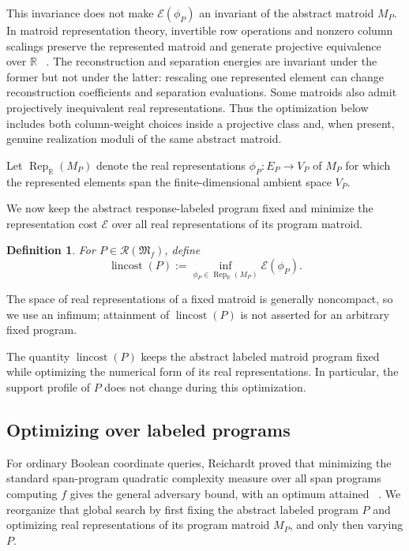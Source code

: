 \documentclass[11pt]{article}
\numberwithin{equation}{section}
\newtheorem{definition}{Definition}[section]
\theoremstyle{remark}
\begin{document}
This invariance does not make $\mathcal E(\phi_P)$ an invariant of the
abstract matroid $M_P$. In matroid representation theory, invertible row
operations and nonzero column scalings preserve the represented matroid and
generate projective equivalence over $\mathbb R$
~\cite[Sec.~6.3]{Oxley2011}. The reconstruction and separation energies are invariant under the former
but not under the latter: rescaling one represented element can change
reconstruction coefficients and separation evaluations. Some matroids also
admit projectively inequivalent real representations. Thus the optimization
below includes both column-weight choices inside a projective class and,
when present, genuine realization moduli of the same abstract matroid.

Let $\operatorname{Rep}_{\mathbb R}(M_P)$ denote the real representations
$\phi_P:E_P\to V_P$ of $M_P$ for which the represented elements span the
finite-dimensional ambient space $V_P$.

We now keep the abstract response-labeled program fixed and minimize the
representation cost $\mathcal E$ over all real representations of its program
matroid.

\begin{definition}
\label{def:linear-cost}
For $P\in\mathscr R(\mathfrak M_f)$, define
\begin{equation}
    \operatorname{lincost}(P)
    :=
    \inf_{\phi_P\in\operatorname{Rep}_{\mathbb R}(M_P)}
        \mathcal E(\phi_P).
\end{equation}
\end{definition}

The space of real representations of a fixed matroid is generally
noncompact, so we use an infimum; attainment of
$\operatorname{lincost}(P)$ is not asserted for an arbitrary fixed program.

The quantity $\operatorname{lincost}(P)$ keeps the abstract labeled matroid
program fixed while optimizing the numerical form of its real
representations. In particular, the support profile of $P$ does not change
during this optimization.


\subsection{Optimizing over labeled programs}
\label{subsec:matroid-span-program-cost}

For ordinary Boolean coordinate queries, Reichardt proved that minimizing the
standard span-program quadratic complexity measure over all span programs
computing $f$ gives the general adversary bound, with an optimum attained
~\cite{Reichardt2009,Reichardt2014Equivalent}. We reorganize that global
search by first fixing the abstract labeled program $P$ and optimizing real
representations of its program matroid $M_P$, and only then varying $P$.
\end{document}
